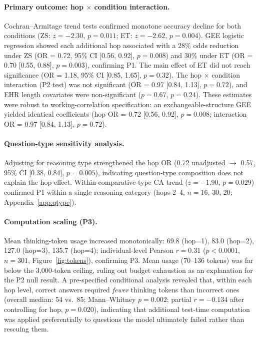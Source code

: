 \documentclass{article}
\begin{document}
\paragraph{Primary outcome: hop $\times$ condition interaction.}
Cochran--Armitage trend tests confirmed monotone accuracy decline for both conditions (ZS: $z = -2.30$, $p = 0.011$; ET: $z = -2.62$, $p = 0.004$). GEE logistic regression showed each additional hop associated with a 28\% odds reduction under ZS (OR = 0.72, 95\% CI [0.56, 0.92], $p = 0.008$) and 30\% under ET (OR = 0.70 [0.55, 0.88], $p = 0.003$), confirming P1. The main effect of ET did not reach significance (OR = 1.18, 95\% CI [0.85, 1.65], $p = 0.32$). The hop $\times$ condition interaction (P2 test) was not significant (OR = 0.97 [0.84, 1.13], $p = 0.72$), and EHR length covariates were non-significant ($p = 0.67$, $p = 0.24$). These estimates were robust to working-correlation specification: an exchangeable-structure GEE yielded identical coefficients (hop OR = 0.72 [0.56, 0.92], $p = 0.008$; interaction OR = 0.97 [0.84, 1.13], $p = 0.72$).

\paragraph{Question-type sensitivity analysis.}
Adjusting for reasoning type strengthened the hop OR (0.72 unadjusted $\to$ 0.57, 95\% CI [0.38, 0.84], $p = 0.005$), indicating question-type composition does not explain the hop effect. Within-comparative-type CA trend ($z = -1.90$, $p = 0.029$) confirmed P1 within a single reasoning category (hops 2--4, $n = 16$, $30$, $20$; Appendix~\ref{app:qtype}).

\paragraph{Computation scaling (P3).}
Mean thinking-token usage increased monotonically: 69.8 (hop=1), 83.0 (hop=2), 127.0 (hop=3), 135.7 (hop=4); individual-level Pearson $r = 0.31$ ($p < 0.0001$, $n = 301$, Figure~\ref{fig:tokens}), confirming P3. Mean usage (70--136 tokens) was far below the 3,000-token ceiling, ruling out budget exhaustion as an explanation for the P2 null result. A pre-specified conditional analysis revealed that, within each hop level, correct answers required \emph{fewer} thinking tokens than incorrect ones (overall median: 54 vs.\ 85; Mann--Whitney $p = 0.002$; partial $r = -0.134$ after controlling for hop, $p = 0.020$), indicating that additional test-time computation was applied preferentially to questions the model ultimately failed rather than rescuing them.
\end{document}
